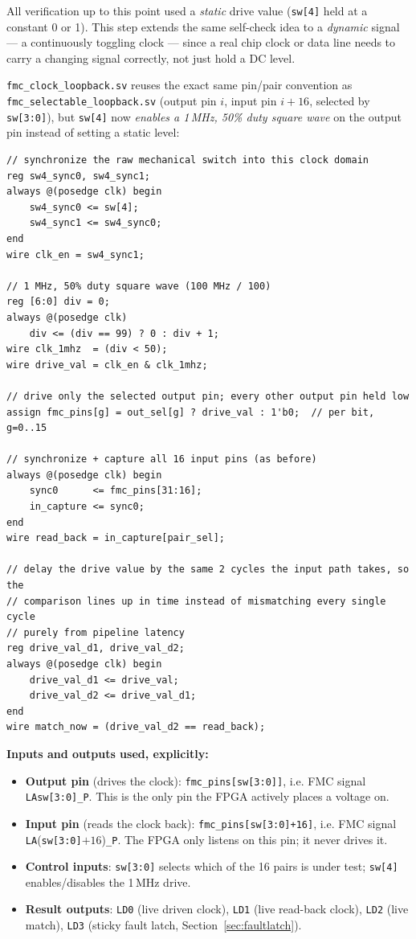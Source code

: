 \documentclass[11pt]{article}
\begin{document}
All verification up to this point used a \emph{static} drive value (\texttt{sw[4]} held
at a constant 0 or 1). This step extends the same self-check idea to a \emph{dynamic}
signal --- a continuously toggling clock --- since a real chip clock or data line needs
to carry a changing signal correctly, not just hold a DC level.

\texttt{fmc\_clock\_loopback.sv} reuses the exact same pin/pair convention as
\texttt{fmc\_selectable\_loopback.sv} (output pin $i$, input pin $i+16$, selected by
\texttt{sw[3:0]}), but \texttt{sw[4]} now \emph{enables a 1\,MHz, 50\% duty square wave}
on the output pin instead of setting a static level:

\begin{lstlisting}[caption={Core clock-generation and comparison logic of fmc\_clock\_loopback.sv}]
// synchronize the raw mechanical switch into this clock domain
reg sw4_sync0, sw4_sync1;
always @(posedge clk) begin
    sw4_sync0 <= sw[4];
    sw4_sync1 <= sw4_sync0;
end
wire clk_en = sw4_sync1;

// 1 MHz, 50% duty square wave (100 MHz / 100)
reg [6:0] div = 0;
always @(posedge clk)
    div <= (div == 99) ? 0 : div + 1;
wire clk_1mhz  = (div < 50);
wire drive_val = clk_en & clk_1mhz;

// drive only the selected output pin; every other output pin held low
assign fmc_pins[g] = out_sel[g] ? drive_val : 1'b0;  // per bit, g=0..15

// synchronize + capture all 16 input pins (as before)
always @(posedge clk) begin
    sync0      <= fmc_pins[31:16];
    in_capture <= sync0;
end
wire read_back = in_capture[pair_sel];

// delay the drive value by the same 2 cycles the input path takes, so the
// comparison lines up in time instead of mismatching every single cycle
// purely from pipeline latency
reg drive_val_d1, drive_val_d2;
always @(posedge clk) begin
    drive_val_d1 <= drive_val;
    drive_val_d2 <= drive_val_d1;
end
wire match_now = (drive_val_d2 == read_back);
\end{lstlisting}

\textbf{Inputs and outputs used, explicitly:}
\begin{itemize}
    \item \textbf{Output pin} (drives the clock): \texttt{fmc\_pins[sw[3:0]]}, i.e. FMC
    signal \texttt{LA}\texttt{sw[3:0]}\texttt{\_P}. This is the only pin the FPGA
    actively places a voltage on.
    \item \textbf{Input pin} (reads the clock back): \texttt{fmc\_pins[sw[3:0]+16]},
    i.e. FMC signal \texttt{LA}(\texttt{sw[3:0]}$+16$)\texttt{\_P}. The FPGA only
    listens on this pin; it never drives it.
    \item \textbf{Control inputs}: \texttt{sw[3:0]} selects which of the 16 pairs is
    under test; \texttt{sw[4]} enables/disables the 1\,MHz drive.
    \item \textbf{Result outputs}: \texttt{LD0} (live driven clock), \texttt{LD1} (live
    read-back clock), \texttt{LD2} (live match), \texttt{LD3} (sticky fault latch,
    Section~\ref{sec:faultlatch}).
\end{itemize}
\end{document}
